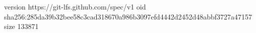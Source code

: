 version https://git-lfs.github.com/spec/v1
oid sha256:285da39b32bee58c3cad318670a986b3097efd4442d2452d48abbf3727a47157
size 133871
